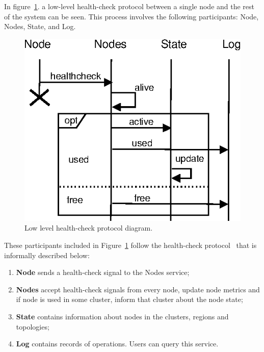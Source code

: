 In figure~\ref{fig:fig6}. a low-level health-check protocol between a single node and the rest of the system can be seen. This process involves the following participants: Node, Nodes, State, and Log.

\begin{figure}[H]
	\begin{center}
		\includegraphics[scale=0.75]{images/FIG2}
	\end{center}
	\vspace{-0.7cm}
	\caption{Low level health-check protocol diagram.}
	\label{fig:fig6}
\end{figure} 

\noindent
These participants included in Figure~\ref{fig:fig6} follow the health-check protocol~\label{informal_description_health-check} that is informally described below:

\begin{enumerate}[start=1,label={(\bfseries \arabic*)}]
	\item \textbf{Node} sends a health-check signal to the Nodes service;
	\item \textbf{Nodes} accept health-check signals from every node, update node metrics and if node is used in some cluster, inform that cluster about the node state;
	\item \textbf{State} contains information about nodes in the clusters, regions and topologies;
	\item \textbf{Log} contains records of operations. Users can query this service. 
\end{enumerate}

